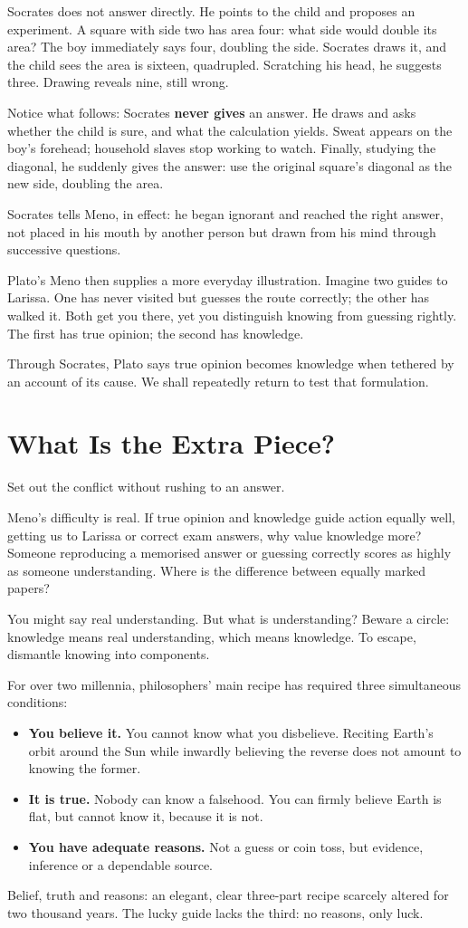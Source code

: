 Socrates does not answer directly. He points to the child and proposes an experiment. A square with side two has area four: what side would double its area? The boy immediately says four, doubling the side. Socrates draws it, and the child sees the area is sixteen, quadrupled. Scratching his head, he suggests three. Drawing reveals nine, still wrong.

Notice what follows: Socrates \textbf{never gives} an answer. He draws and asks whether the child is sure, and what the calculation yields. Sweat appears on the boy's forehead; household slaves stop working to watch. Finally, studying the diagonal, he suddenly gives the answer: use the original square's diagonal as the new side, doubling the area.

Socrates tells Meno, in effect: he began ignorant and reached the right answer, not placed in his mouth by another person but drawn from his mind through successive questions.

Plato's Meno then supplies a more everyday illustration. Imagine two guides to Larissa. One has never visited but guesses the route correctly; the other has walked it. Both get you there, yet you distinguish knowing from guessing rightly. The first has true opinion; the second has knowledge.

Through Socrates, Plato says true opinion becomes knowledge when tethered by an account of its cause. We shall repeatedly return to test that formulation.

\section{What Is the Extra Piece?}
Set out the conflict without rushing to an answer.

Meno's difficulty is real. If true opinion and knowledge guide action equally well, getting us to Larissa or correct exam answers, why value knowledge more? Someone reproducing a memorised answer or guessing correctly scores as highly as someone understanding. Where is the difference between equally marked papers?

You might say real understanding. But what is understanding? Beware a circle: knowledge means real understanding, which means knowledge. To escape, dismantle knowing into components.

For over two millennia, philosophers' main recipe has required three simultaneous conditions:

\begin{itemize}
\item \textbf{You believe it.} You cannot know what you disbelieve. Reciting Earth's orbit around the Sun while inwardly believing the reverse does not amount to knowing the former.
\item \textbf{It is true.} Nobody can know a falsehood. You can firmly believe Earth is flat, but cannot know it, because it is not.
\item \textbf{You have adequate reasons.} Not a guess or coin toss, but evidence, inference or a dependable source.
\end{itemize}
Belief, truth and reasons: an elegant, clear three-part recipe scarcely altered for two thousand years. The lucky guide lacks the third: no reasons, only luck.

